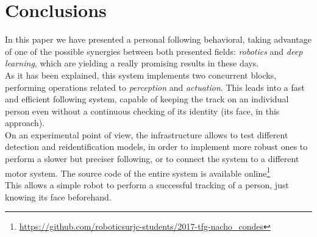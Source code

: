 \section{Conclusions}

In this paper we have presented a personal following behavioral, taking advantage of one of the possible synergies between both presented fields: \emph{robotics} and \emph{deep learning}, which are yielding a really promising results in these days.\\


As it has been explained, this system implements two concurrent blocks, performing operations related to \emph{perception} and \emph{actuation}. This leads into a fast and efficient following system, capable of keeping the track on an individual person even without a continuous checking of its identity (its face, in this approach).\\

On an experimental point of view, the infrastructure allows to test different detection and reidentification models, in order to implement more robust ones to perform a slower but preciser following, or to connect the system to a different motor system. The source code of the entire system is available online\footnote{\url{https://github.com/roboticsurjc-students/2017-tfg-nacho_condes}}\\


This allows a simple robot to perform a successful tracking of a person, just knowing its face beforehand. 
